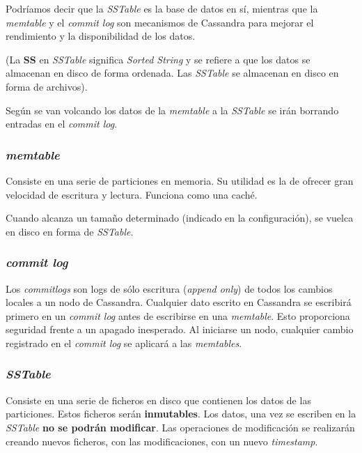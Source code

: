 \documentclass[
]{book}
\begin{document}
Podríamos decir que la \emph{SSTable} es la base de datos en sí, mientras que la \emph{memtable} y el \emph{commit log} son mecanismos de Cassandra para mejorar el rendimiento y la disponibilidad de los datos.

(La \textbf{SS} en \emph{SSTable} significa \emph{Sorted String} y se refiere a que los datos se almacenan en disco de forma ordenada. Las \emph{SSTable} se almacenan en disco en forma de archivos).

Según se van volcando los datos de la \emph{memtable} a la \emph{SSTable} se irán borrando entradas en el \emph{commit log}.

\subsubsection{\texorpdfstring{\emph{memtable}}{memtable}}\label{memtable}

Consiste en una serie de particiones en memoria. Su utilidad es la de ofrecer gran velocidad de escritura y lectura. Funciona como una caché.

Cuando alcanza un tamaño determinado (indicado en la configuración), se vuelca en disco en forma de \emph{SSTable}.

\subsubsection{\texorpdfstring{\emph{commit log}}{commit log}}\label{commit-log}

Los \emph{commitlogs} son logs de sólo escritura (\emph{append only}) de todos los cambios locales a un nodo de Cassandra. Cualquier dato escrito en Cassandra se escribirá primero en un \emph{commit log} antes de escribirse en una \emph{memtable}. Esto proporciona seguridad frente a un apagado inesperado. Al iniciarse un nodo, cualquier cambio registrado en el \emph{commit log} se aplicará a las \emph{memtables}.

\subsubsection{\texorpdfstring{\emph{SSTable}}{SSTable}}\label{sstable}

Consiste en una serie de ficheros en disco que contienen los datos de las particiones. Estos ficheros serán \textbf{inmutables}. Los datos, una vez se escriben en la \emph{SSTable} \textbf{no se podrán modificar}. Las operaciones de modificación se realizarán creando nuevos ficheros, con las modificaciones, con un nuevo \emph{timestamp}.
\end{document}
